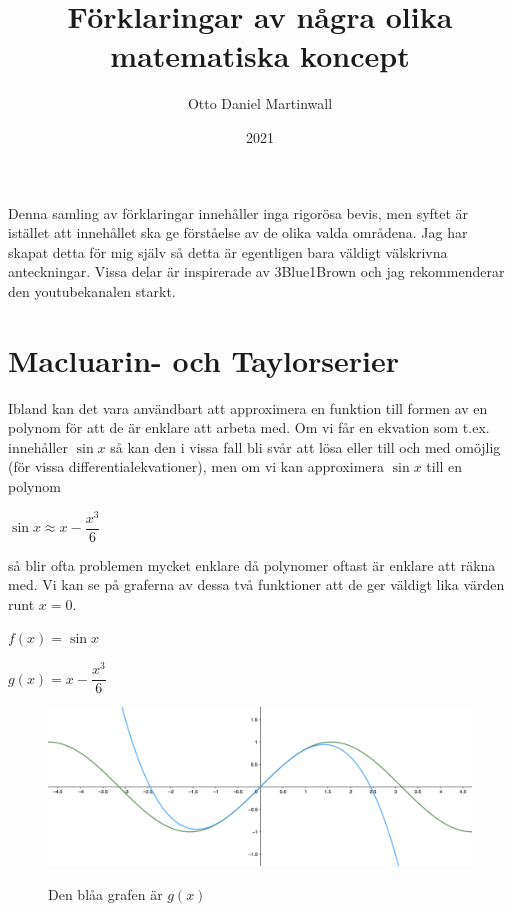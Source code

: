 \documentclass[10pt, a4paper]{amsart}
\begin{document}
\title{Förklaringar av några olika matematiska koncept}
\author{Otto Daniel Martinwall}
\date{2021}
\maketitle
\tableofcontents

\newpage

Denna samling av förklaringar innehåller inga rigorösa bevis, men syftet är istället att innehållet ska ge förståelse av de olika valda områdena.
Jag har skapat detta för mig själv så detta är egentligen bara väldigt välskrivna anteckningar.
Vissa delar är inspirerade av 3Blue1Brown och jag rekommenderar den youtubekanalen starkt.
\bigskip

\newpage
\section{Macluarin- och Taylorserier}   

\bigskip
Ibland kan det vara användbart att approximera en funktion till formen av en polynom för att de är enklare att arbeta med. 
Om vi får en ekvation som t.ex. innehåller $\sin x$ så kan den i vissa fall bli svår att lösa eller till och med omöjlig (för vissa differentialekvationer), 
men om vi kan approximera $ \sin x $ till en polynom
\vspace{24pt plus 4pt minus 4pt}

\hspace{5ex}
$ \sin x \approx x - \dfrac{x^3}{6} $
\vspace{24pt plus 4pt minus 4pt}

så blir ofta problemen mycket enklare då polynomer oftast är enklare att räkna med.
Vi kan se på graferna av dessa två funktioner att de ger väldigt lika värden runt $ x = 0 $.
\vspace{24pt plus 4pt minus 4pt}

\hspace{5ex}
$ f(x) = \sin x $

\hspace{5ex}
$ g(x) = x - \dfrac{x^3}{6} $

\begin{figure}[ht!]
    \includegraphics[width=\linewidth]{photos/chapter1/1.png}
    \centerline{Den blåa grafen är $ g(x) $}
\end{figure}
\bigskip
\end{document}
